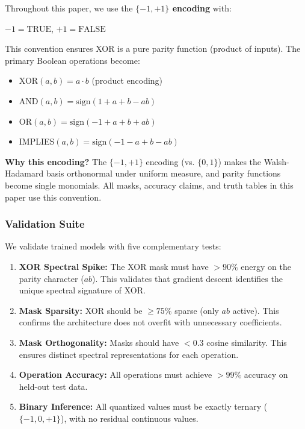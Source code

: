 \documentclass[Royal,times,sageh]{sagej}
\newcommand{\sign}{\text{sign}}
\begin{document}
\begin{tcolorbox}[colback=blue!5, colframe=blue!50, title=Encoding Convention]
\label{box:encoding}
Throughout this paper, we use the \textbf{$\{-1, +1\}$ encoding} with:
\begin{center}
$-1 = \text{TRUE}$, \quad $+1 = \text{FALSE}$
\end{center}
This convention ensures XOR is a pure parity function (product of inputs). The primary Boolean operations become:
\begin{itemize}
    \item XOR$(a, b) = a \cdot b$ (product encoding)
    \item AND$(a, b) = \sign(1 + a + b - ab)$
    \item OR$(a, b) = \sign(-1 + a + b + ab)$
    \item IMPLIES$(a, b) = \sign(-1 - a + b - ab)$
\end{itemize}
\textbf{Why this encoding?} The $\{-1,+1\}$ encoding (vs. $\{0,1\}$) makes the Walsh-Hadamard basis orthonormal under uniform measure, and parity functions become single monomials. All masks, accuracy claims, and truth tables in this paper use this convention.
\end{tcolorbox}

\subsubsection{Validation Suite}
\label{sec:phase1_validation}

We validate trained models with five complementary tests:

\begin{enumerate}
    \item \textbf{XOR Spectral Spike:} The XOR mask must have $>90\%$ energy on the parity character ($ab$). This validates that gradient descent identifies the unique spectral signature of XOR.

    \item \textbf{Mask Sparsity:} XOR should be $\geq 75\%$ sparse (only $ab$ active). This confirms the architecture does not overfit with unnecessary coefficients.

    \item \textbf{Mask Orthogonality:} Masks should have $<0.3$ cosine similarity. This ensures distinct spectral representations for each operation.

    \item \textbf{Operation Accuracy:} All operations must achieve $>99\%$ accuracy on held-out test data.

    \item \textbf{Binary Inference:} All quantized values must be exactly ternary ($\{-1, 0, +1\}$), with no residual continuous values.
\end{enumerate}
\end{document}
